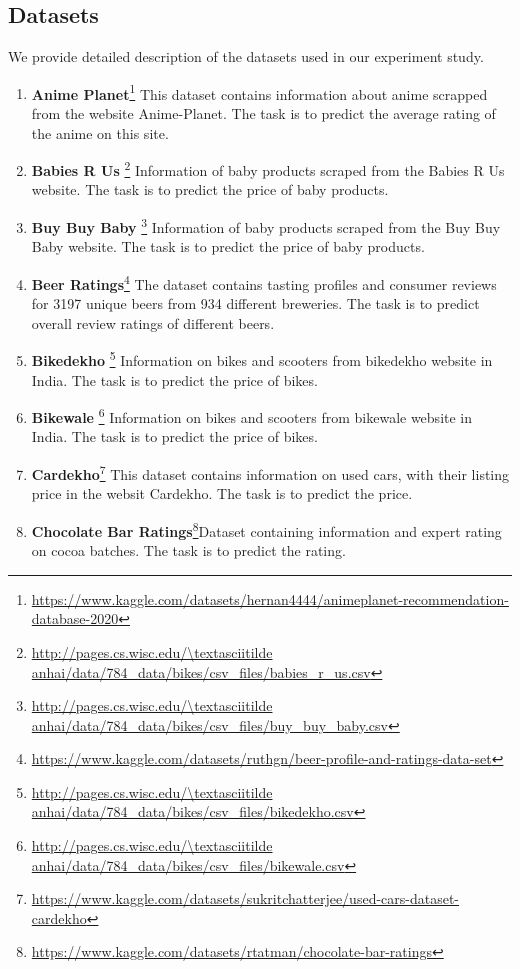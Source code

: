\documentclass{article}
\theoremstyle{plain}
\theoremstyle{definition}
\theoremstyle{remark}
\begin{document}
\subsection{Datasets}
We provide detailed description of the datasets used in our experiment study. 
\begin{enumerate}
    \item \textbf{Anime Planet}\footnote{\url{https://www.kaggle.com/datasets/hernan4444/animeplanet-recommendation-database-2020}} This dataset contains information about anime scrapped from the website Anime-Planet. The task is to predict the average rating of the anime on this site.
    \item \textbf{Babies R Us} \citep{magellandata}\footnote{\url{http://pages.cs.wisc.edu/\textasciitilde anhai/data/784\_data/bikes/csv\_files/babies_r_us.csv}} Information of baby products scraped from the Babies R Us website. The task is to predict the price of baby products.    
    \item \textbf{Buy Buy Baby} \citep{magellandata}\footnote{\url{http://pages.cs.wisc.edu/\textasciitilde anhai/data/784\_data/bikes/csv\_files/buy_buy_baby.csv}} Information of baby products scraped from the Buy Buy Baby website. The task is to predict the price of baby products.    
    \item \textbf{Beer Ratings}\footnote{\url{https://www.kaggle.com/datasets/ruthgn/beer-profile-and-ratings-data-set}} The dataset contains tasting profiles and consumer reviews for 3197 unique beers from 934 different breweries. The task is to predict overall review ratings of different beers.
    \item \textbf{Bikedekho} \citep{magellandata}\footnote{\url{http://pages.cs.wisc.edu/\textasciitilde anhai/data/784\_data/bikes/csv\_files/bikedekho.csv}} Information on bikes and scooters from bikedekho website in India. The task is to predict the price of bikes.
    \item \textbf{Bikewale} \citep{magellandata}\footnote{\url{http://pages.cs.wisc.edu/\textasciitilde anhai/data/784\_data/bikes/csv\_files/bikewale.csv}} Information on bikes and scooters from bikewale website in India. The task is to predict the price of bikes.
    \item \textbf{Cardekho}\footnote{\url{https://www.kaggle.com/datasets/sukritchatterjee/used-cars-dataset-cardekho}} This dataset contains information on used cars, with their listing price in the websit Cardekho. The task is to predict the price.
    \item \textbf{Chocolate Bar Ratings}\footnote{\url{https://www.kaggle.com/datasets/rtatman/chocolate-bar-ratings}}Dataset containing information and expert rating on cocoa batches. The task is to predict the rating.

\end{enumerate}
\end{document}
